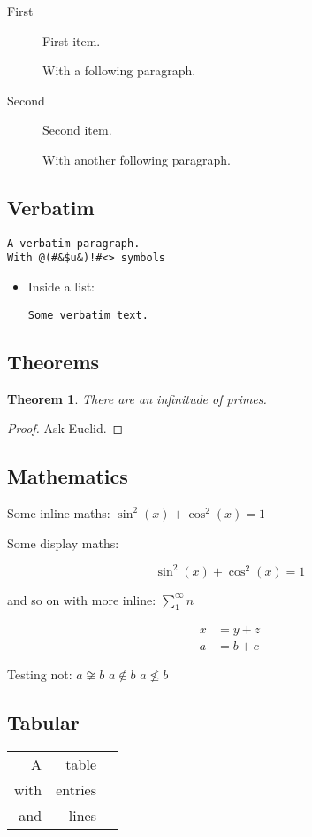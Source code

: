 \documentclass[
  text,
  xhtml,
  itex
]{internet}
\newtheorem{theorem}{Theorem}
\begin{document}
\begin{description}
\item[First] First item.

With a following paragraph.

\item[Second] Second item.

With another following paragraph.
\end{description}


\subsection{Verbatim}

\begin{verbatim}
A verbatim paragraph.
With @(#&$u&)!#<> symbols
\end{verbatim}

\begin{itemize}
\item Inside a list:

\begin{verbatim}
Some verbatim text.
\end{verbatim}

\end{itemize}

\subsection{Theorems}

\begin{theorem}
There are an infinitude of primes.
\end{theorem}

\begin{proof}
Ask Euclid.
\end{proof}

\subsection{Mathematics}

Some inline maths: \(\sin^2(x) + \cos^2(x) = 1\)

Some display maths:

\[
  \sin^2(x) + \cos^2(x) = 1
\]

and so on with more inline: \(\sum_1^\infty n\)

\begin{align*}
x &= y + z \\
a &= b + c
\end{align*}

Testing not: \(a \not\cong b\) \(a \not\in b\) \(a \not\le b\)

\subsection{Tabular}

\begin{tabular}{rrr}
A & table \\
with & entries \\ \hline
and & lines
\end{tabular}
\end{document}
